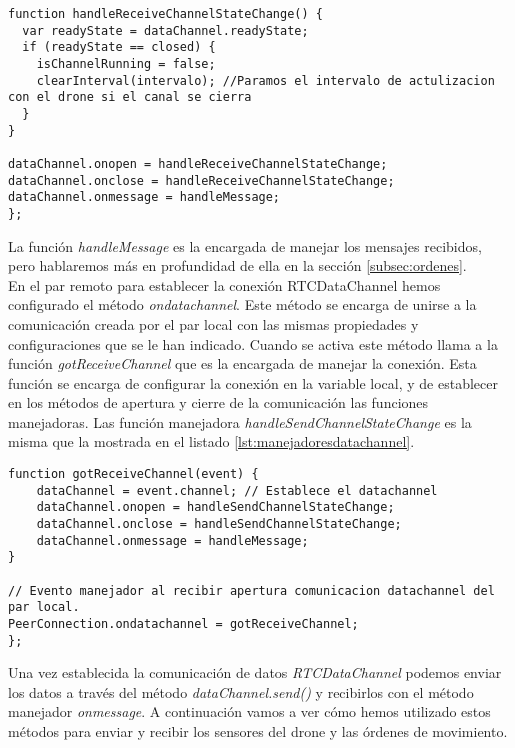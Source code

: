 \begin{lstlisting}[caption={Manejadores de RTCdataChannel.}, label={lst:manejadoresdatachannel}]
function handleReceiveChannelStateChange() {
  var readyState = dataChannel.readyState;
  if (readyState == closed) {
    isChannelRunning = false;
    clearInterval(intervalo); //Paramos el intervalo de actulizacion con el drone si el canal se cierra
  }
}

dataChannel.onopen = handleReceiveChannelStateChange;
dataChannel.onclose = handleReceiveChannelStateChange;
dataChannel.onmessage = handleMessage;
};\end{lstlisting}

La función \emph{handleMessage} es la encargada de manejar los mensajes recibidos, pero hablaremos más en profundidad de ella en la sección \ref{subsec:ordenes}.\\

En el par remoto para establecer la conexión RTCDataChannel hemos configurado el método \emph{ondatachannel}. Este método se encarga de unirse a la comunicación creada por el par local con las mismas propiedades y configuraciones que se le han indicado. Cuando se activa este método llama a la función \emph{gotReceiveChannel} que es la encargada de manejar  la conexión. Esta función se encarga de configurar la conexión en la variable local, y de establecer en los métodos de apertura y cierre de la comunicación las funciones manejadoras. Las función manejadora \emph{handleSendChannelStateChange} es la misma que la mostrada en el listado \ref{lst:manejadoresdatachannel}.\\

\begin{lstlisting}[caption={Establecimiento de RTCDataChannel en el par remoto.}]
function gotReceiveChannel(event) {
	dataChannel = event.channel; // Establece el datachannel
	dataChannel.onopen = handleSendChannelStateChange;
	dataChannel.onclose = handleSendChannelStateChange;
	dataChannel.onmessage = handleMessage;
}

// Evento manejador al recibir apertura comunicacion datachannel del par local.
PeerConnection.ondatachannel = gotReceiveChannel;
};\end{lstlisting}

Una vez establecida la comunicación de datos \emph{RTCDataChannel} podemos enviar los datos a través del método \emph{dataChannel.send()} y recibirlos con el método manejador \emph{onmessage}. A continuación vamos a ver cómo hemos utilizado estos métodos para enviar y recibir los sensores del drone y las órdenes de movimiento.\\


